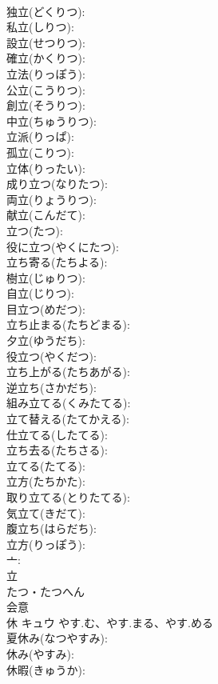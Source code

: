 \documentclass[8pt]{extreport}
\begin{document}
\begin{CJK}{UTF8}{min}
\\	独立(どくりつ): 
\\	私立(しりつ): 
\\	設立(せつりつ): 
\\	確立(かくりつ): 
\\	立法(りっぽう): 
\\	公立(こうりつ): 
\\	創立(そうりつ): 
\\	中立(ちゅうりつ): 
\\	立派(りっぱ): 
\\	孤立(こりつ): 
\\	立体(りったい): 
\\	成り立つ(なりたつ): 
\\	両立(りょうりつ): 
\\	献立(こんだて): 
\\	立つ(たつ): 
\\	役に立つ(やくにたつ): 
\\	立ち寄る(たちよる): 
\\	樹立(じゅりつ): 
\\	自立(じりつ): 
\\	目立つ(めだつ): 
\\	立ち止まる(たちどまる): 
\\	夕立(ゆうだち): 
\\	役立つ(やくだつ): 
\\	立ち上がる(たちあがる): 
\\	逆立ち(さかだち): 
\\	組み立てる(くみたてる): 
\\	立て替える(たてかえる): 
\\	仕立てる(したてる): 
\\	立ち去る(たちさる): 
\\	立てる(たてる): 
\\	立方(たちかた): 
\\	取り立てる(とりたてる): 
\\	気立て(きだて): 
\\	腹立ち(はらだち): 
\\	立方(りっぽう): 
\\	亠: 
\\	立	
\\	たつ・たつへん	
\\	会意 
\\	休	キュウ	やす.む、やす.まる、やす.める		
\\	夏休み(なつやすみ): 
\\	休み(やすみ): 
\\	休暇(きゅうか): 

\end{CJK}
\end{document}

